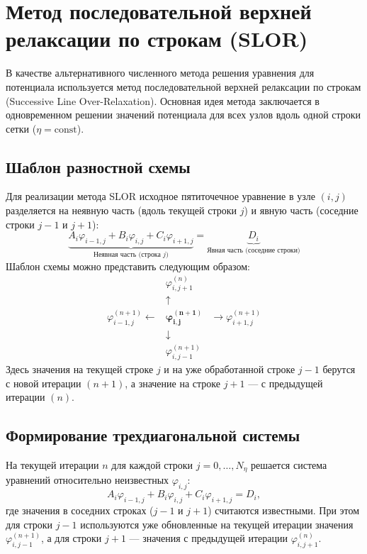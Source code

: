 \section{Метод последовательной верхней релаксации по строкам (SLOR)}
	
	В качестве альтернативного численного метода решения уравнения для потенциала используется метод последовательной верхней релаксации по строкам (Successive Line Over-Relaxation). Основная идея метода заключается в одновременном решении значений потенциала для всех узлов вдоль одной строки сетки ($\eta = \text{const}$). 
	
	\subsection{Шаблон разностной схемы}
	
	Для реализации метода SLOR исходное пятиточечное уравнение в узле $(i,j)$ разделяется на неявную часть (вдоль текущей строки $j$) и явную часть (соседние строки $j-1$ и $j+1$):
	\begin{equation}
		\underbrace{A_i \varphi_{i-1,j} + B_i \varphi_{i,j} + C_i \varphi_{i+1,j}}_{\text{Неявная часть (строка } j\text{)}} = \underbrace{D_i}_{\text{Явная часть (соседние строки)}}
	\end{equation}
	Шаблон схемы можно представить следующим образом:
	\begin{equation*}
		\begin{matrix}
			& \varphi_{i,j+1}^{(n)} & \\
			& \uparrow & \\
			\varphi_{i-1,j}^{(n+1)} \leftarrow & \mathbf{\varphi_{i,j}^{(n+1)}} & \rightarrow \varphi_{i+1,j}^{(n+1)} \\
			& \downarrow & \\
			& \varphi_{i,j-1}^{(n+1)} & 
		\end{matrix}
	\end{equation*}
	Здесь значения на текущей строке $j$ и на уже обработанной строке $j-1$ берутся с новой итерации $(n+1)$, а значение на строке $j+1$ — с предыдущей итерации $(n)$.
	
	\subsection{Формирование трехдиагональной системы}
	На текущей итерации $n$ для каждой строки $j = 0, \dots, N_\eta$ решается система уравнений относительно неизвестных $\varphi_{i,j}$:
	\begin{equation}
		A_i \varphi_{i-1,j} + B_i \varphi_{i,j} + C_i \varphi_{i+1,j} = D_i,
		\label{eq:slor_tridiag}
	\end{equation}
	где значения в соседних строках ($j-1$ и $j+1$) считаются известными. При этом для строки $j-1$ используются уже обновленные на текущей итерации значения $\varphi_{i,j-1}^{(n+1)}$, а для строки $j+1$ — значения с предыдущей итерации $\varphi_{i,j+1}^{(n)}$.
	
